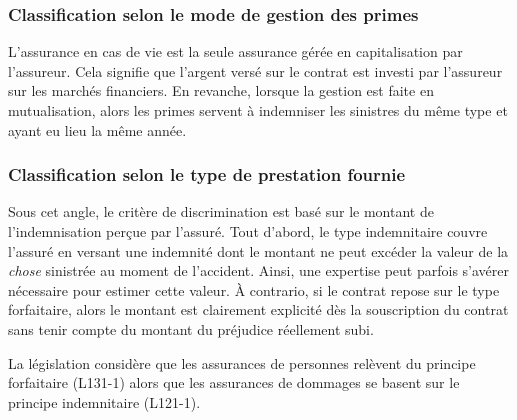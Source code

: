 \documentclass{article}
\begin{document}
\subsubsection{Classification selon le mode de gestion des primes}
L'assurance en cas de vie est la seule assurance gérée en capitalisation par l'assureur. Cela signifie que l'argent versé sur le contrat est investi par l'assureur sur les marchés financiers. En revanche, lorsque la gestion est faite en mutualisation, alors les primes servent à indemniser les sinistres du même type et ayant eu lieu la même année.

\subsubsection{Classification selon le type de prestation fournie}
Sous cet angle, le critère de discrimination est basé sur le montant de l'indemnisation perçue par l'assuré. Tout d'abord, le type indemnitaire couvre l'assuré en versant une indemnité dont le montant ne peut excéder la valeur de la \textit{chose} sinistrée au moment de l'accident. Ainsi, une expertise peut parfois s'avérer nécessaire pour estimer cette valeur. À contrario, si le contrat repose sur le type forfaitaire, alors le montant est clairement explicité dès la souscription du contrat sans tenir compte du montant du préjudice réellement subi.

La législation considère que les assurances de personnes relèvent du principe forfaitaire (L131-1) alors que les assurances de dommages se basent sur le principe indemnitaire (L121-1).
\end{document}
